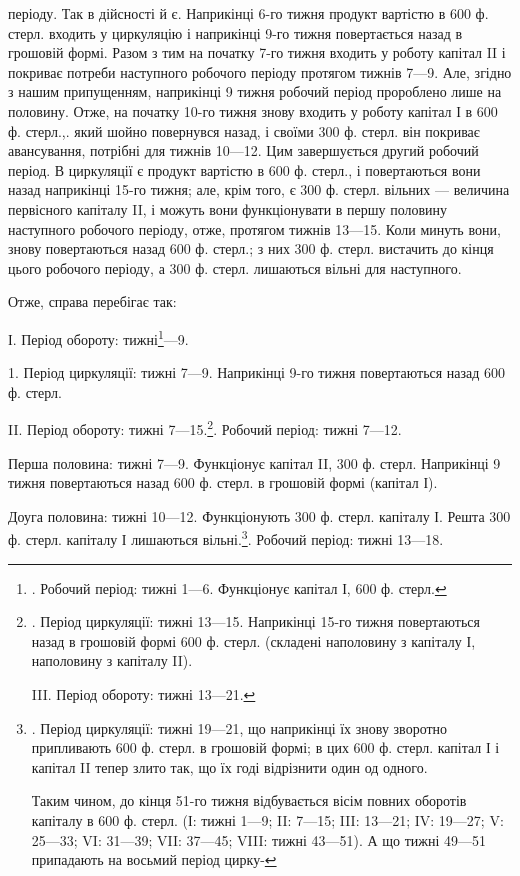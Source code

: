 \parcont{}  %
періоду. Так в дійсності й є. Наприкінці 6-го тижня продукт вартістю
в 600 ф. стерл. входить у циркуляцію і наприкінці 9-го тижня повертається
назад в грошовій формі. Разом з тим на початку 7-го тижня
входить у роботу капітал II і покриває потреби наступного робочого
періоду протягом тижнів 7—9. Але, згідно з нашим припущенням, наприкінці
9 тижня робочий період пророблено лише на половину. Отже, на
початку 10-го тижня знову входить у роботу капітал І в 600 ф. стерл.,.
який шойно повернувся назад, і своїми 300 ф. стерл. він покриває авансування,
потрібні для тижнів 10—12. Цим завершується другий робочий
період. В циркуляції є продукт вартістю в 600 ф. стерл., і повертаються
вони назад наприкінці 15-го тижня; але, крім того, є 300 ф. стерл.
вільних — величина первісного капіталу II, і можуть вони функціонувати
в першу половину наступного робочого періоду, отже, протягом тижнів
13—15. Коли минуть вони, знову повертаються назад 600 ф. стерл.;
з них 300 ф. стерл. вистачить до кінця цього робочого періоду, а
300 ф. стерл. лишаються вільні для наступного.

Отже, справа перебігає так:

І. Період обороту: тижні\footnote{
. Робочий період: тижні 1—6. Функціонує капітал І, 600 ф. стерл.
}—9.

1. Період циркуляції: тижні 7—9. Наприкінці 9-го тижня повертаються
назад 600 ф. стерл.

II. Період обороту: тижні 7—15.\footnote{
. Період циркуляції: тижні 13—15. Наприкінці 15-го тижня повертаються
назад в грошовій формі 600 ф. стерл. (складені наполовину
з капіталу І, наполовину з капіталу II).

III. Період обороту: тижні 13—21.
}. Робочий період: тижні 7—12.

Перша половина: тижні 7—9. Функціонує капітал II, 300 ф. стерл.
Наприкінці 9 тижня повертаються назад 600 ф. стерл. в грошовій формі
(капітал І).

Доуга половина: тижні 10—12. Функціонують 300 ф. стерл. капіталу
І. Решта 300 ф. стерл. капіталу І лишаються вільні.\footnote{
. Період циркуляції: тижні 19—21, що наприкінці їх знову зворотно
припливають 600 ф. стерл. в грошовій формі; в цих 600 ф. стерл.
капітал І і капітал II тепер злито так, що їх годі відрізнити один од одного.

Таким чином, до кінця 51-го тижня відбувається вісім повних оборотів
капіталу в 600 ф. стерл. (І: тижні 1—9; II: 7—15; III: 13—21;
IV: 19—27; V: 25—33; VI: 31—39; VII: 37—45; VIII: тижні
43—51). А що тижні 49—51 припадають на восьмий період цирку-
}. Робочий період: тижні 13—18.

